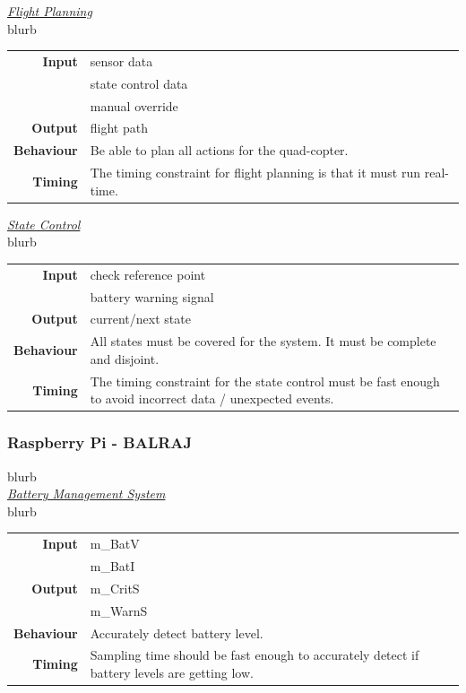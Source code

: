 \documentclass[10pt,letterpaper]{article}
\begin{document}
\underline{\textit{Flight Planning}} \\[2mm]
blurb
\begin{center}
  \begin{tabular}{r p{8.5cm}}
      \textbf{Input} & sensor data \\ & state control data \\ & manual override \\
      \textbf{Output} & flight path\\
      \textbf{Behaviour} & Be able to plan all actions for the quad-copter.\\ 
      \textbf{Timing} & The timing constraint for flight planning is that it must run real-time. \\
  \end{tabular}
\end{center}

\underline{\textit{State Control}} \\[2mm]
blurb
\begin{center}
  \begin{tabular}{r p{8.5cm}}
      \textbf{Input} & check reference point\\ &  battery warning signal \\
      \textbf{Output} & current/next state \\
      \textbf{Behaviour} & All states must be covered for the system. It must be complete and disjoint. \\
      \textbf{Timing} & The timing constraint for the state control must be fast enough to avoid incorrect data / unexpected events. \\
  \end{tabular}
\end{center}


\subsubsection{Raspberry Pi - BALRAJ}
blurb \\

\underline{\textit{Battery Management System}} \\[2mm]
blurb
\begin{center}
  \begin{tabular}{r p{8.5cm}}
      \textbf{Input} & m\_BatV \\ & m\_BatI \\
      \textbf{Output} & m\_CritS \\ & m\_WarnS \\
      \textbf{Behaviour} & Accurately detect battery level. \\
      \textbf{Timing} & Sampling time should be fast enough to accurately detect if battery levels are getting low. \\
  \end{tabular}
\end{center}
\end{document}
